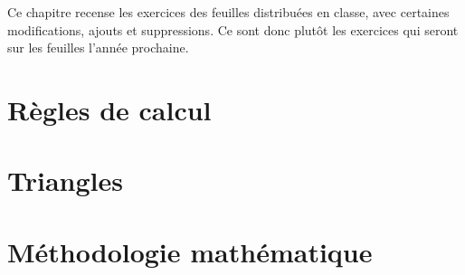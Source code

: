 
\begin{center}
    \small
Ce chapitre recense les exercices des feuilles distribuées en classe, avec certaines modifications, ajouts et suppressions. Ce sont donc plutôt les exercices qui seront sur les feuilles l'année prochaine.
\end{center}

\section{Règles de calcul}






\section{Triangles}


\section{Méthodologie mathématique}

